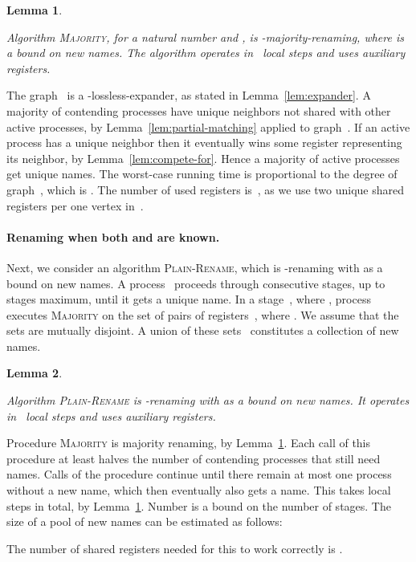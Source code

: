 \documentclass[11pt]{article}
\newcommand{\BBB}{\vspace*{-\bigskipamount}}
\newcommand{\Paragraph}[1]{\BBB\paragraph{#1}}
\newcommand{\qed}{\hfill  \smallbreak}
\newenvironment{proof}{\noindent{\bf Proof:}}{\qed}
\newtheorem{lemma}{Lemma}
\begin{document}
\begin{lemma}
\label{lem:majority}

Algorithm \textsc{Majority},  for a natural number  and , is -majority-renaming, where  is a  bound on new names.
The algorithm operates in~ local steps and uses  auxiliary registers.
\end{lemma}


\begin{proof} 
The graph~ is a -lossless-expander, as stated in Lemma~\ref{lem:expander}.
A majority of contending processes have unique neighbors not shared with other active processes, by Lemma~\ref{lem:partial-matching} applied to graph~.
If an active process has a unique neighbor then it eventually wins some register representing its neighbor, by Lemma~\ref{lem:compete-for}. 
Hence a majority of active processes get unique names.
The worst-case running time is proportional to the degree  of graph~, which is . 
The number of used registers is~, as we use two unique shared registers per one vertex in~. 
\end{proof} 




\Paragraph{Renaming when both  and  are known.}


Next, we consider an algorithm \textsc{Plain-Rename}, which is  -renaming with  as a bound on new names.
A process~ proceeds through consecutive stages,  up to  stages maximum,  until it gets a unique name. 
In a stage~, where , process~ executes \textsc{Majority} on the set of pairs of registers~, where .
We assume that the sets  are mutually disjoint.
A union of these sets~ constitutes a collection of new names.



\begin{lemma}
\label{lem:Plain-Rename}

Algorithm \textsc{Plain-Rename} is -renaming with  as a bound on new names.
It  operates in~ local steps and uses  auxiliary registers. 
\end{lemma}

\begin{proof}
Procedure \textsc{Majority} is majority renaming, by Lemma~\ref{lem:majority}.
Each call of this procedure at least halves the number of contending processes that still need names.
Calls of the procedure continue until there remain at most one process without a new name, which then eventually also gets a name. 
This takes  local steps in total,  by Lemma~\ref{lem:majority}.
Number  is a bound on the number of stages.
The size of a pool of new names can be estimated as follows: 

The number of  shared registers needed for this to work correctly is .  
\end{proof}
\end{document}
